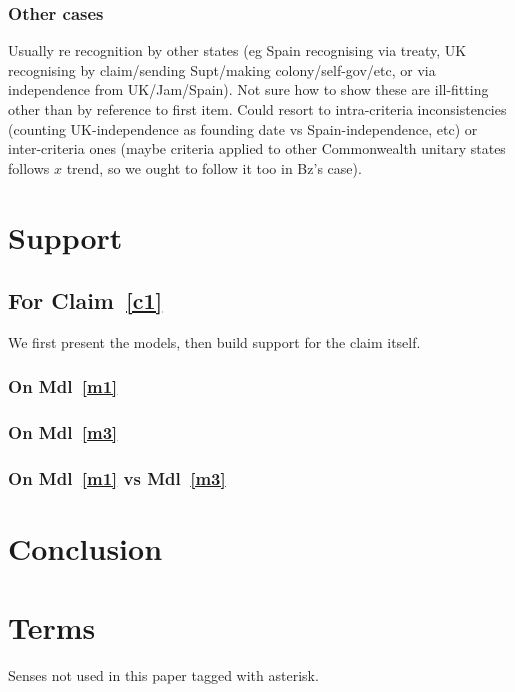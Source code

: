 \documentclass{amsart}
\theoremstyle{definition}%
\theoremstyle{definition}%
\theoremstyle{remark}%
\begin{document}
\subsubsection{Other cases} Usually re recognition by other states (eg Spain recognising via treaty, UK recognising by claim/sending Supt/making colony/self-gov/etc, or via independence from UK/Jam/Spain). Not sure how to show these are ill-fitting other than by reference to first item. Could resort to intra-criteria inconsistencies (counting UK-independence as founding date vs Spain-independence, etc) or inter-criteria ones (maybe criteria applied to other Commonwealth unitary states follows \(x\) trend, so we ought to follow it too in Bz's case).
%
%
%
%
\section{Support}
\label{s:support}
\subsection{For Claim~\ref{c1}} We first present the models, then build support for the claim itself.
\subsubsection{On Mdl~\ref{m1}}
\subsubsection{On Mdl~\ref{m3}}
\subsubsection{On Mdl~\ref{m1} vs Mdl~\ref{m3}}
%
%
%
%
\section{Conclusion}
\label{s:concl}
\lipsum[1][1-6]
%
%
%
% 
\begin{bibdiv}
\label{s:refs}
\begin{biblist}
\end{biblist}
\end{bibdiv}
%
%
%
%
\newpage%
\appendix%
%
%
\section{Terms}%
\label{s:terms}
Senses not used in this paper tagged with asterisk.
%
\end{document}
